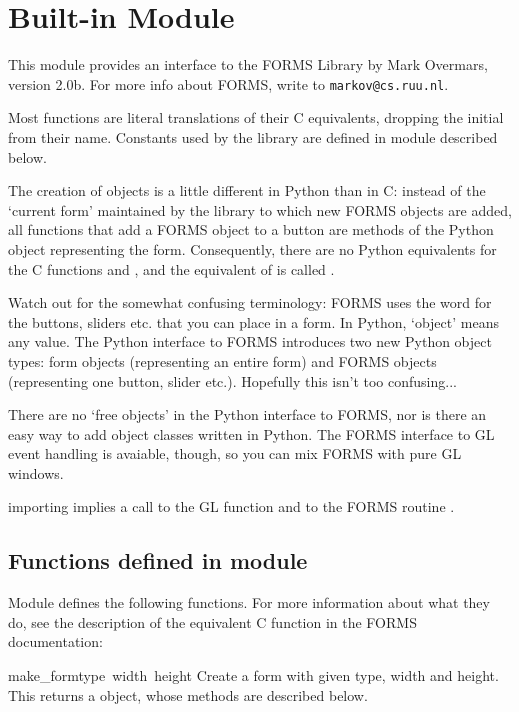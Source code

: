 \section{Built-in Module }

This module provides an interface to the FORMS Library by Mark
Overmars, version 2.0b.  For more info about FORMS, write to
{\tt markov@cs.ruu.nl}.

Most functions are literal translations of their C equivalents,
dropping the initial  from their name.  Constants used by the
library are defined in module  described below.

The creation of objects is a little different in Python than in C:
instead of the `current form' maintained by the library to which new
FORMS objects are added, all functions that add a FORMS object to a
button are methods of the Python object representing the form.
Consequently, there are no Python equivalents for the C functions
 and , and the equivalent of
 is called .

Watch out for the somewhat confusing terminology: FORMS uses the word
 for the buttons, sliders etc. that you can place in a form.
In Python, `object' means any value.  The Python interface to FORMS
introduces two new Python object types: form objects (representing an
entire form) and FORMS objects (representing one button, slider etc.).
Hopefully this isn't too confusing...

There are no `free objects' in the Python interface to FORMS, nor is
there an easy way to add object classes written in Python.  The FORMS
interface to GL event handling is avaiable, though, so you can mix
FORMS with pure GL windows.

 importing  implies a call to the GL function
 and to the FORMS routine .

\subsection{Functions defined in module }

Module  defines the following functions.  For more information
about what they do, see the description of the equivalent C function
in the FORMS documentation:

\renewcommand{\indexsubitem}{(in module fl)}
\begin{funcdesc}{make_form}{type\, width\, height}
Create a form with given type, width and height.  This returns a
 object, whose methods are described below.
\end{funcdesc}


